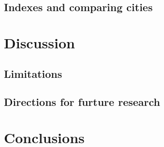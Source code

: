 \documentclass[preprint, 3p,
authoryear]{elsarticle} %
\begin{document}
\subsection{Indexes and comparing
cities}\label{indexes-and-comparing-cities}

\section{Discussion}\label{discussion}

\subsection{Limitations}\label{limitations}

\subsection{Directions for furture
research}\label{directions-for-furture-research}

\section{Conclusions}\label{conclusions}

\renewcommand\refname{References}

\end{document}
